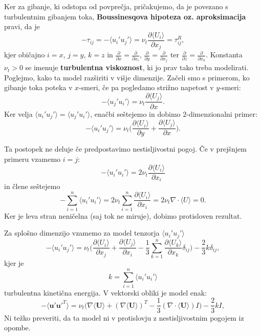 \documentclass[mat2, tisk]{fmfdelo}
\newcommand{\bd}{\textbf}
\begin{document}
Ker za gibanje, ki odstopa od povprečja, pričakujemo, da je povezano s turbulentnim
gibanjem toka, \bd{Boussinesqova hipoteza oz. aproksimacija} pravi, da je 
\begin{equation}
-\tau_{ij} = -\langle u_i' u_j'\rangle = \nu_t \frac{\partial \langle U_i\rangle}{\partial x_j} = \tau_{ij}^R,
\end{equation}
kjer običajno $i=x$, $j=y$, $k=z$ in $\frac{\partial}{\partial x} = \frac{\partial}{\partial x_i}$, $\frac{\partial}{\partial y} = \frac{\partial}{\partial x_j}$ ter 
$\frac{\partial}{\partial z} = \frac{\partial}{\partial x_k}$. Konstanta $\nu_t>0$ se imenuje \bd{turbulentna viskoznost}, 
ki jo prav tako treba modelirati. Poglejmo, kako ta model razširiti v višje dimenzije. 
Začeli smo s primerom, ko gibanje toka poteka v $x$-smeri, če pa 
pogledamo strižno napetost v $y$-smeri:
$$
-\langle u_j' u_i' \rangle = \nu_t \frac{\partial \langle U_j\rangle}{\partial x}.
$$
Ker velja $\langle u_i' u_j' \rangle = \langle u_j' u_i' \rangle$, enačbi seštejemo in 
dobimo $2$-dimenzionalni primer: 
\begin{equation}
\label{eq:2dmodel}
-\langle u_i' u_j' \rangle = \nu_t \Big(\frac{\partial \langle U_i\rangle}{\partial y} + \frac{\partial \langle U_j\rangle}{\partial x}\Big).
\end{equation}
\begin{opomba}
Ta postopek ne deluje če predpostavimo nestisljivostni pogoj. 
Če v prejšnjem primeru vzamemo $i=j$:
$$
-\langle u_i' u_i' \rangle = 2\nu_t \frac{\partial \langle U_i\rangle}{\partial x_i}
$$
in člene seštejemo 
$$
-\sum_{i=1}^n \langle u_i' u_i' \rangle = 2\nu_t \sum_{i=1}^n \frac{\partial \langle U_i\rangle}{\partial x_i} = 2\nu_t \nabla\cdot \langle U\rangle = 0.
$$
Ker je leva stran neničelna (saj tok ne miruje), dobimo protisloven rezultat.
\end{opomba}
Za splošno dimenzijo vzamemo za model tenzorja $\langle u_i' u_j' \rangle$
\begin{equation}
- \langle u_i' u_j' \rangle = \nu_t \Big(\frac{\partial\langle U_i\rangle}{\partial x_j} + \frac{\partial\langle U_j\rangle}{\partial x_i}
- \frac{1}{3} \sum_{k=1}^n \frac{\partial\langle U_k\rangle}{\partial x_k}\delta_{ij}\Big) - \frac{2}{3}k\delta_{ij},
\end{equation}
kjer je 
$$k = \sum_{i=1}^n \langle u_i' u_i' \rangle$$ 
turbulentna kinetična energija. V vektorski obliki je model enak:
\begin{equation}
-\langle \bd{u}' \bd{u}'^T \rangle = \nu_t \Big(\nabla\langle \bd{U}\rangle + (\nabla\langle \bd{U}\rangle)^T - \frac{1}{3}(\nabla\cdot\langle \bd{U}\rangle)I\Big) - \frac{2}{3}kI,
\end{equation}
Ni težko preveriti, da ta model ni v protislovju z nestisljivostnim pogojem iz opombe.
\end{document}
